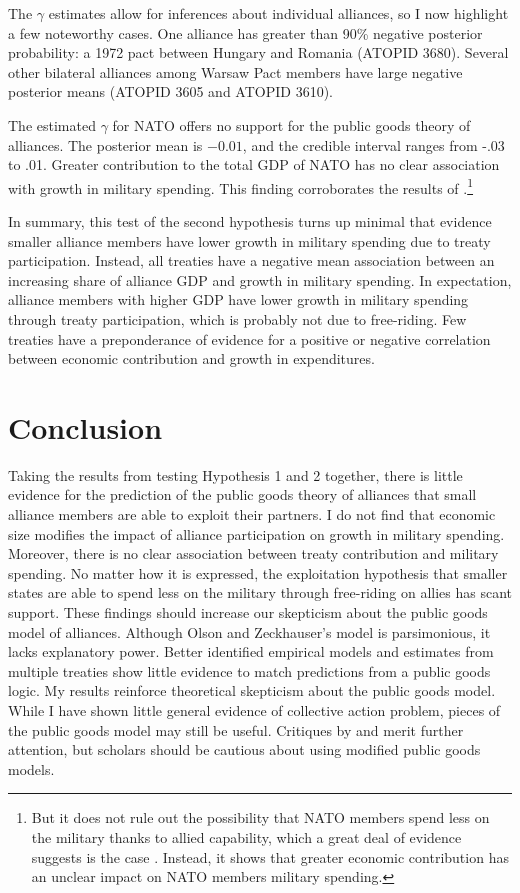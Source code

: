 \documentclass[12pt]{article}
\begin{document}
The $\gamma$ estimates allow for inferences about individual alliances, so I now highlight a few noteworthy cases. 
One alliance has greater than 90\% negative posterior probability: a 1972 pact between Hungary and Romania (ATOPID 3680). 
Several other bilateral alliances among Warsaw Pact members have large negative posterior means (ATOPID 3605 and ATOPID 3610). 

 
The estimated $\gamma$ for NATO offers no support for the public goods theory of alliances. 
The posterior mean is $-0.01$, and the credible interval ranges from -.03 to .01.  
Greater contribution to the total GDP of NATO has no clear association with growth in military spending. 
This finding corroborates the results of \citet{PluemperNeumayer2015}.\footnote{But it does not rule out the possibility that NATO members spend less on the military thanks to allied capability, which a great deal of evidence suggests is the case \citep{GeorgeSandler2017}. Instead, it shows that greater economic contribution has an unclear impact on NATO members military spending.}


In summary, this test of the second hypothesis turns up minimal that evidence smaller alliance members have lower growth in military spending due to treaty participation. 
Instead, all treaties have a negative mean association between an increasing share of alliance GDP and growth in military spending. 
In expectation, alliance members with higher GDP have lower growth in military spending through treaty participation, which is probably not due to free-riding. 
Few treaties have a preponderance of evidence for a positive or negative correlation between economic contribution and growth in expenditures.   


\section{Conclusion}

Taking the results from testing Hypothesis 1 and 2 together, there is little evidence for the prediction of the public goods theory of alliances that small alliance members are able to exploit their partners. 
I do not find that economic size modifies the impact of alliance participation on growth in military spending.
Moreover, there is no clear association between treaty contribution and military spending. 
No matter how it is expressed, the exploitation hypothesis that smaller states are able to spend less on the military through free-riding on allies has scant support. 
These findings should increase our skepticism about the public goods model of alliances. 
Although Olson and Zeckhauser's model is parsimonious, it lacks explanatory power. 
Better identified empirical models and estimates from multiple treaties show little evidence to match predictions from a public goods logic. 
My results reinforce theoretical skepticism about the public goods model. 
While I have shown little general evidence of collective action problem, pieces of the public goods model may still be useful. 
Critiques by \citet{Palmer1990} and \citet{SandlerHartley2001} merit further attention, but scholars should be cautious about using modified public goods models. 
\end{document}
